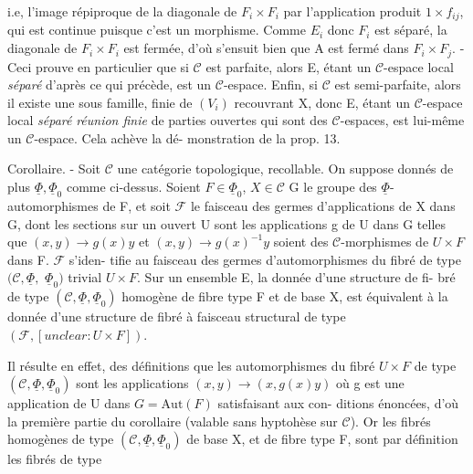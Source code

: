 \newpage


i.e, l'image répiproque de la diagonale de $F_i \times F_i$ par l'application
produit $1 \times f_{ij}$, qui est continue puisque c'est un morphisme. Comme
$E_i$ donc $F_i$ est séparé, la diagonale de $F_i \times F_i$ est fermée, d'où s'ensuit
bien que A est fermé dans $F_i \times F_j$. - Ceci prouve en particulier que si
$\mathcal{C}$ est parfaite, alors E, étant un $\mathcal{C}$-espace local \emph{séparé} d'après
ce qui précède, est un $\mathcal{C}$-espace. Enfin, si $\mathcal{C}$ est semi-parfaite,
alors il existe une sous famille, finie de $(V_i)$ recouvrant X, donc E,
étant un $\mathcal{C}$-espace local \emph{séparé} \emph{réunion finie} de parties ouvertes qui
sont des $\mathcal{C}$-espaces, est lui-même un $\mathcal{C}$-espace. Cela achève la dé-
monstration de la prop. 13.

Corollaire. - Soit $\mathcal{C}$ une catégorie topologique, recollable. On
suppose donnés de plus $\underline{\Phi}, \underline{\Phi}_0$ comme ci-dessus. Soient $F \in \underline{\Phi}_0$, $X \in \mathcal{C}$
G le groupe des $\underline{\Phi}$-automorphismes de F, et soit $\mathcal{F}$ le faisceau des
germes d'applications de X dans G, dont les sections sur un ouvert U
sont les applications g de U dans G telles que $(x,y) \rightarrow g(x)y$ et
$(x,y) \rightarrow g(x)^{-1}y$ soient des $\mathcal{C}$-morphismes de $U \times F$ dans F. $\mathcal{F}$ s'iden-
tifie au faisceau des germes d'automorphismes du fibré de type $(\mathcal{C}, \underline{\Phi},$
$\underline{\Phi}_0)$ trivial $U \times F$. Sur un ensemble E, la donnée d'une structure de fi-
bré de type $(\mathcal{C}, \underline{\Phi}, \underline{\Phi}_0)$ homogène de fibre type F et de base X, est
équivalent à la donnée d'une structure de fibré à faisceau structural
de type $(\mathcal{F}, [unclear: U \times F])$.

Il résulte en effet, des définitions que les automorphismes du
fibré $U \times F$ de type $(\mathcal{C}, \underline{\Phi}, \underline{\Phi}_0)$ sont les applications $(x,y) \rightarrow (x,g(x)y)$
où g est une application de U dans $G = \text{Aut}(F)$ satisfaisant aux con-
ditions énoncées, d'où la première partie du corollaire (valable sans
hyptohèse sur $\mathcal{C}$). Or les fibrés homogènes de type $(\mathcal{C}, \underline{\Phi}, \underline{\Phi}_0)$ de
base X, et de fibre type F, sont par définition les fibrés de type

\newpage

